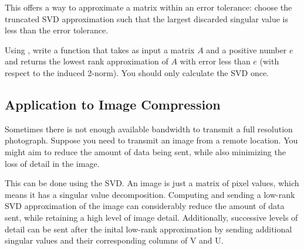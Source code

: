 This offers a way to approximate a matrix within an error tolerance:
choose the truncated SVD approximation such that the largest discarded singular value is less than the error tolerance.

\begin{problem}
Using , write a function  that takes as input a matrix $A$ and a positive number $e$ and returns
the lowest rank approximation of $A$ with error less than $e$ (with respect to the induced 2-norm).
You should only calculate the SVD once.
\end{problem}

\subsection*{Application to Image Compression}

Sometimes there is not enough available bandwidth to transmit a full resolution photograph.
Suppose you need to transmit an image from a remote location.
You might aim to reduce the amount of data being sent, while also minimizing the loss of detail in the image.

This can be done using the SVD.
An image is just a matrix of pixel values, which means it has a singular value decomposition.
Computing and sending a low-rank SVD approximation of the image can considerably reduce the amount of data sent, while retaining a high level of image detail.
Additionally, successive levels of detail can be sent after the inital low-rank approximation by sending additional singular values and their corresponding columns of V and U.

